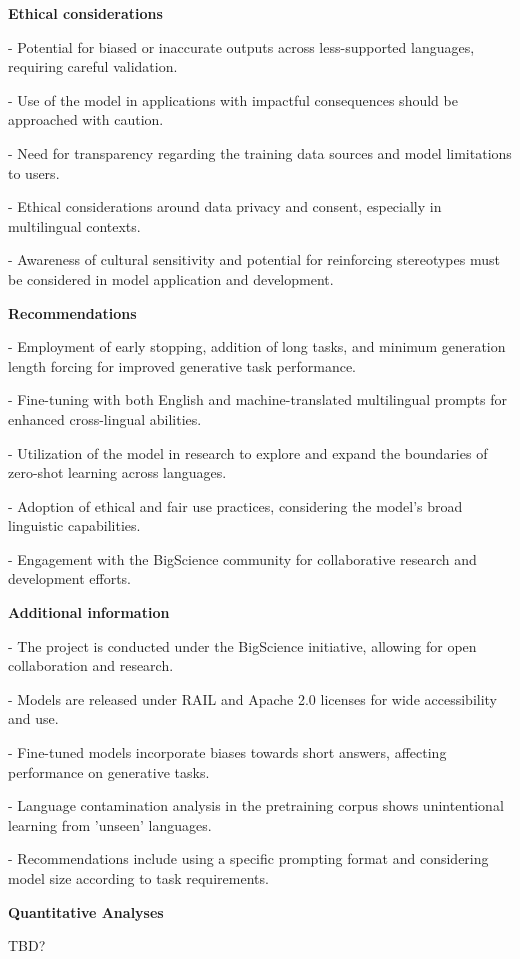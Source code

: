 \documentclass{article}
\begin{document}
\begin{adjustwidth}{-60pt}{-30pt}
\begin{singlespace}
\begin{tcolorbox}[title=\textbf{My Happy Model (test)! : Model Card},
breakable, sharp corners, boxrule=0.7pt]
    \textbf{Ethical considerations}
            \item - Potential for biased or inaccurate outputs across less-supported languages, requiring careful validation.
            \item - Use of the model in applications with impactful consequences should be approached with caution.
            \item - Need for transparency regarding the training data sources and model limitations to users.
            \item - Ethical considerations around data privacy and consent, especially in multilingual contexts.
            \item - Awareness of cultural sensitivity and potential for reinforcing stereotypes must be considered in model application and development.
    
    \textbf{Recommendations}
            \item - Employment of early stopping, addition of long tasks, and minimum generation length forcing for improved generative task performance.
            \item - Fine-tuning with both English and machine-translated multilingual prompts for enhanced cross-lingual abilities.
            \item - Utilization of the model in research to explore and expand the boundaries of zero-shot learning across languages.
            \item - Adoption of ethical and fair use practices, considering the model's broad linguistic capabilities.
            \item - Engagement with the BigScience community for collaborative research and development efforts.
    
    \textbf{Additional information}
            \item - The project is conducted under the BigScience initiative, allowing for open collaboration and research.
            \item - Models are released under RAIL and Apache 2.0 licenses for wide accessibility and use.
            \item - Fine-tuned models incorporate biases towards short answers, affecting performance on generative tasks.
            \item - Language contamination analysis in the pretraining corpus shows unintentional learning from 'unseen' languages.
            \item - Recommendations include using a specific prompting format and considering model size according to task requirements.
    
 


\textbf{Quantitative Analyses}

TBD?

\end{tcolorbox}
\end{singlespace}
\end{adjustwidth}
\end{document}
